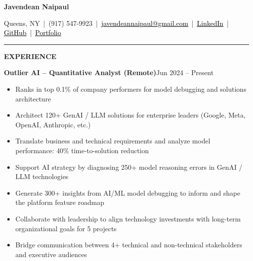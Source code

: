 \documentclass[8pt]{extarticle}
\newcommand{\Section}[1]{%
  \vspace{0.5\baselineskip}\hrule
  \vspace{0.12\baselineskip}%
  \begin{center}\textbf{\scshape #1}\end{center}}
\begin{document}
\pagestyle{empty}

\begin{center}
{\Large\textbf{Javendean Naipaul}}\par
Queens, NY \,|\, (917) 547-9923 \,|\,%
\href{mailto:javendeannaipaul@gmail.com}{\textcolor{black}{\underline{javendeannaipaul@gmail.com}}} \,|\, %
\href{https://www.linkedin.com/in/javendean-naipaul-229b11169/}{\textcolor{black}{\underline{LinkedIn}}} \,|\, %
\href{https://github.com/Javendean}{\textcolor{black}{\underline{GitHub}}} \,|\, %
\href{https://javendean.github.io/Portfolio/Data.html}{\textcolor{black}{\underline{Portfolio}}}
\end{center}

\Section{EXPERIENCE}

\textbf{Outlier AI -- Quantitative Analyst (Remote)}\hfill Jun 2024 -- Present
\begin{itemize}
  \item Ranks in top 0.1\% of company performers for model debugging and solutions architecture
  \item Architect 120+ GenAI / LLM solutions for enterprise leaders (Google, Meta, OpenAI, Anthropic, etc.)
  \item Translate business and technical requirements and analyze model performance: 40\% time-to-solution reduction
  \item Support AI strategy by diagnosing 250+ model reasoning errors in GenAI / LLM technologies
  \item Generate 300+ insights from AI/ML model debugging to inform and shape the platform feature roadmap
  \item Collaborate with leadership to align technology investments with long-term organizational goals for 5 projects
  \item Bridge communication between 4+ technical and non-technical stakeholders and executive audiences
\end{itemize}
\end{document}
